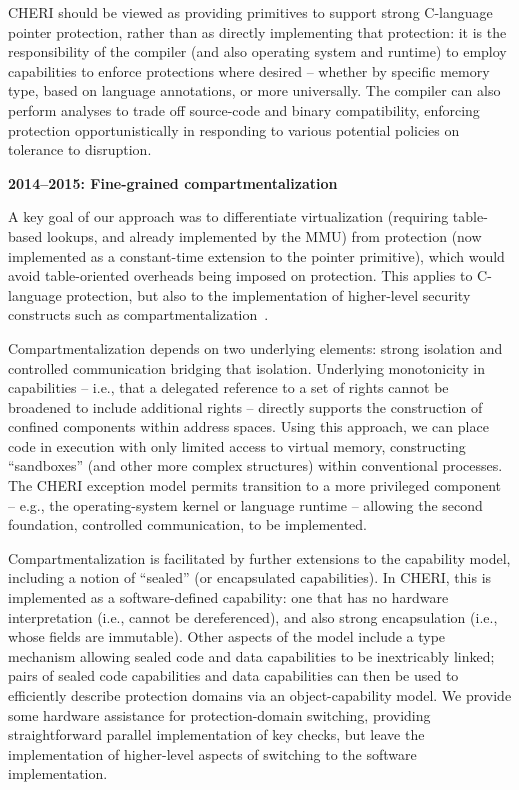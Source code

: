 CHERI should be viewed as providing primitives to support strong C-language
pointer protection, rather than as directly implementing that protection: it
is the responsibility of the compiler (and also operating system and
runtime) to employ capabilities to enforce protections where desired --
whether by specific memory type, based on language annotations, or more
universally.
The compiler can also perform analyses to trade off source-code and binary
compatibility, enforcing protection opportunistically in responding to various
potential policies on tolerance to disruption.

\medskip
\noindent
\textbf{2014--2015: Fine-grained compartmentalization}

\smallskip
\noindent
A key goal of our approach was to differentiate virtualization (requiring
table-based lookups, and already implemented by the MMU) from protection
(now implemented as a constant-time extension to the pointer primitive), which
would avoid table-oriented overheads being imposed on protection.
This applies to C-language protection, but also to the implementation of
higher-level security constructs such as
compartmentalization~\cite{watson15:cheri,watson2016:microjournal}.

Compartmentalization depends on two underlying elements: strong isolation and
controlled communication bridging that isolation.
Underlying monotonicity in capabilities -- i.e., that a delegated reference
to a set of rights cannot be broadened to include additional rights --
directly supports the construction of confined components within address
spaces.
Using this approach, we can place code in execution with only limited
access to virtual memory, constructing ``sandboxes'' (and other more complex
structures) within conventional processes.
The CHERI exception model permits transition to a more privileged component
-- e.g., the operating-system kernel or language runtime -- allowing the
second foundation, controlled communication, to be implemented.

Compartmentalization is facilitated by further extensions to the capability
model, including a notion of ``sealed'' (or encapsulated capabilities).
In CHERI, this is implemented as a software-defined capability: one that has
no hardware interpretation (i.e., cannot be dereferenced), and also strong
encapsulation (i.e., whose fields are immutable).
Other aspects of the model include a type mechanism allowing sealed code and
data capabilities to be inextricably linked; pairs of sealed code
capabilities and data
capabilities can then be used to efficiently describe protection domains via
an object-capability model.
We provide some hardware assistance for protection-domain switching,
providing straightforward parallel implementation of key checks, but leave
the implementation of higher-level aspects of switching to the software
implementation.

